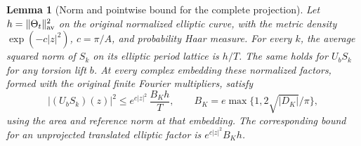 \documentclass[a4paper,11pt]{article}
\newtheorem{lemma}[proposition]{Lemma}
\theoremstyle{definition}
\theoremstyle{remark}
\numberwithin{equation}{section}
\begin{document}
\begin{lemma}[Norm and pointwise bound for the complete projection]\leavevmode
\label{lem:packetnorm497}
Let \(h=\|\Theta_t\|_{\rm av}^2\) on the original normalized
elliptic curve, with the metric density \(\exp(-c|z|^2)\),
\(c=\pi/A\), and probability Haar measure. For every \(k\), the
average squared norm of \(S_k\) on its elliptic period lattice
is \(h/T\). The same holds for \(U_b S_k\) for any torsion lift
\(b\). At every complex embedding these normalized factors,
formed with the original finite Fourier multipliers, satisfy
\[
        |(U_b S_k)(z)|^2
          \le e^{c|z|^2}\,\frac{B_K h}{T},\qquad
        B_K=e\max\{1,2\sqrt{|D_K|}/\pi\},
\]
using the area and reference norm at that embedding. The
corresponding bound for an unprojected translated elliptic
factor is \(e^{c|z|^2}B_K h\).
\end{lemma}
\end{document}
